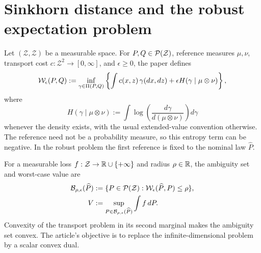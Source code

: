 \section{Sinkhorn distance and the robust expectation problem}
Let $(\mathcal Z,\mathcal Z)$ be a measurable space.  For $P,Q\in\mathcal{P}(\mathcal Z)$, reference measures $\mu,\nu$, transport cost $c:\mathcal Z^2\to[0,\infty]$, and $\epsilon\ge0$, the paper defines
\begin{equation}\label{eq:WGX-distance}
 \mathcal{W}_\epsilon(P,Q)
 :=\inf_{\gamma\in\Pi(P,Q)}
 \left\{
 \int c(x,z)\,\gamma(dx,dz)
 +\epsilon H(\gamma\mid\mu\otimes\nu)
 \right\},
\end{equation}
where
\[
 H(\gamma\mid\mu\otimes\nu)
 :=\int\log\!\left(\frac{d\gamma}{d(\mu\otimes\nu)}\right)d\gamma
\]
whenever the density exists, with the usual extended-value convention otherwise.  The reference need not be a probability measure, so this entropy term can be negative.  In the robust problem the first reference is fixed to the nominal law $\widehat P$.

For a measurable loss $f:\mathcal Z\to\mathbb{R}\cup\{+\infty\}$ and radius $\rho\in\mathbb{R}$, the ambiguity set and worst-case value are
\begin{align}
 \mathcal B_{\rho,\epsilon}(\widehat P)
 &:=\{P\in\mathcal{P}(\mathcal Z):\mathcal{W}_\epsilon(\widehat P,P)\le\rho\},\label{eq:WGX-ball}\\
 V&:=\sup_{P\in\mathcal B_{\rho,\epsilon}(\widehat P)}\int f\,dP.\label{eq:WGX-primal}
\end{align}
Convexity of the transport problem in its second marginal makes the ambiguity set convex.  The article's objective is to replace the infinite-dimensional problem by a scalar convex dual.

